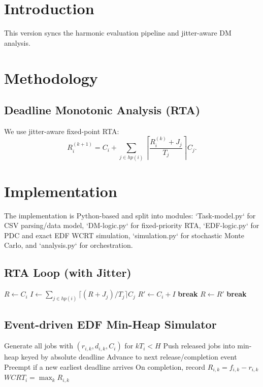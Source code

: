 \documentclass[a4paper,11pt]{article}
\begin{document}
\section{Introduction}
This version syncs the harmonic evaluation pipeline and jitter-aware DM analysis.

\section{Methodology}
\subsection{Deadline Monotonic Analysis (RTA)}
We use jitter-aware fixed-point RTA:
\[
R_i^{(k+1)} = C_i + \sum_{j\in hp(i)}\left\lceil\frac{R_i^{(k)}+J_j}{T_j}\right\rceil C_j.
\]

\section{Implementation}
The implementation is Python-based and split into modules: `Task-model.py` for CSV parsing/data model, `DM-logic.py` for fixed-priority RTA, `EDF-logic.py` for PDC and exact EDF WCRT simulation, `simulation.py` for stochastic Monte Carlo, and `analysis.py` for orchestration.

\subsection*{RTA Loop (with Jitter)}
\begin{algorithm}[H]
\caption{DM RTA with release jitter}
\begin{algorithmic}[1]
\State $R \gets C_i$
\State $I \gets \sum_{j\in hp(i)} \lceil (R + J_j)/T_j \rceil C_j$
\State $R' \gets C_i + I$
 \State \textbf{break} \EndIf
\State $R \gets R'$
 \State \textbf{break} \EndIf
\EndWhile
\EndFor
\end{algorithmic}
\end{algorithm}

\subsection*{Event-driven EDF Min-Heap Simulator}
\begin{algorithm}[H]
\caption{Exact EDF simulation over $[0,H)$}
\begin{algorithmic}[1]
\State Generate all jobs with $(r_{i,k}, d_{i,k}, C_i)$ for $kT_i<H$
\State Push released jobs into min-heap keyed by absolute deadline
\State Advance to next release/completion event
\State Preempt if a new earliest deadline arrives
\State On completion, record $R_{i,k}=f_{i,k}-r_{i,k}$
\EndWhile
\State $WCRT_i = \max_k R_{i,k}$
\end{algorithmic}
\end{algorithm}
\end{document}
